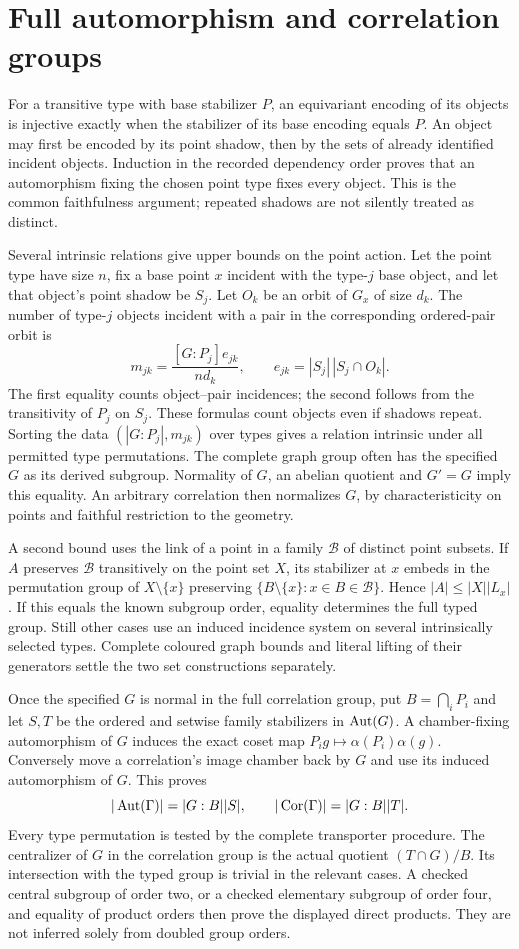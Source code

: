\section{Full automorphism and correlation groups}
For a transitive type with base stabilizer $P$, an equivariant encoding
of its objects is injective exactly when the stabilizer of its base
encoding equals $P$. An object may first be encoded by its point shadow,
then by the sets of already identified incident objects. Induction in
the recorded dependency order proves that an automorphism fixing the
chosen point type fixes every object. This is the common faithfulness
argument; repeated shadows are not silently treated as distinct.

Several intrinsic relations give upper bounds on the point action.
Let the point type have size $n$, fix a base point $x$ incident with
the type-$j$ base object, and let that object's point shadow be $S_j$.
Let $O_k$ be an orbit of $G_x$ of size $d_k$.
The number of type-$j$ objects incident with a pair in the corresponding
ordered-pair orbit is
\[
 m_{jk}=\frac{[G:P_j]e_{jk}}{n d_k},
 \qquad e_{jk}=|S_j|\,|S_j\cap O_k|.
\]
The first equality counts object--pair incidences; the second follows
from the transitivity of $P_j$ on $S_j$. These formulas count objects
even if shadows repeat. Sorting the data $(|G:P_j|,m_{jk})$ over types
gives a relation intrinsic under all permitted type permutations.
The complete graph group often has the specified $G$ as its derived
subgroup. Normality of $G$, an abelian quotient and $G'=G$ imply this
equality. An arbitrary correlation then normalizes $G$, by characteristicity
on points and faithful restriction to the geometry.

A second bound uses the link of a point in a family $\mathcal B$ of
distinct point subsets. If $A$ preserves $\mathcal B$ transitively on
the point set $X$, its stabilizer at $x$ embeds in the permutation group
of $X\setminus\{x\}$ preserving
$\{B\setminus\{x\}:x\in B\in\mathcal B\}$. Hence
$|A|\leq |X||L_x|$. If this equals the known subgroup order, equality
determines the full typed group. Still other cases use an induced
incidence system on several intrinsically selected types. Complete
coloured graph bounds and literal lifting of their generators settle
the two set constructions separately.

Once the specified $G$ is normal in the full correlation group, put
$B=\bigcap_iP_i$ and let $S,T$ be the ordered and setwise family
stabilizers in $\operatorname{Aut}(G)$. A chamber-fixing automorphism of $G$ induces
the exact coset map $P_i g\mapsto \alpha(P_i)\alpha(g)$. Conversely
move a correlation's image chamber back by $G$ and use its induced
automorphism of $G$. This proves
\[
 |\operatorname{Aut}(\Gamma)|=|G:B||S|,\qquad
 |\operatorname{Cor}(\Gamma)|=|G:B||T|.
\]
Every type permutation is tested by the complete transporter procedure.
The centralizer of $G$ in the correlation group is the actual quotient
$(T\cap G)/B$. Its intersection with the typed group is trivial in the
relevant cases. A checked central subgroup of order two, or a checked
elementary subgroup of order four, and equality of product orders then
prove the displayed direct products. They are not inferred solely from
doubled group orders.

